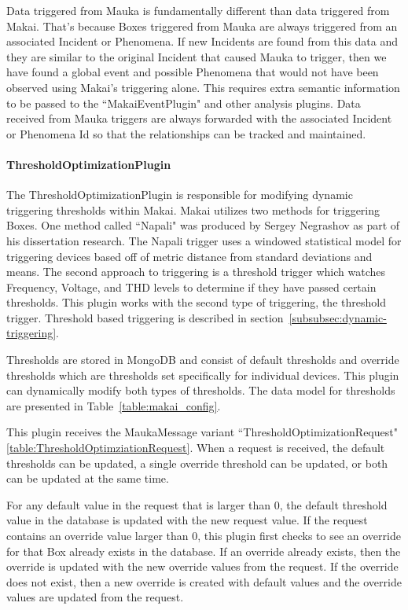 Data triggered from Mauka is fundamentally different than data triggered from Makai. That's because Boxes triggered from Mauka are always triggered from an associated Incident or Phenomena. If new Incidents are found from this data and they are similar to the original Incident that caused Mauka to trigger, then we have found a global event and possible Phenomena that would not have been observed using Makai's triggering alone. This requires extra semantic information to be passed to the ``MakaiEventPlugin" and other analysis plugins. Data received from Mauka triggers are always forwarded with the associated Incident or Phenomena Id so that the relationships can be tracked and maintained.

\paragraph{ThresholdOptimizationPlugin}\label{subsubsec:threshold-optimization-pugin}
The ThresholdOptimizationPlugin is responsible for modifying dynamic triggering thresholds within Makai. Makai utilizes two methods for triggering Boxes. One method called ``Napali" was produced by Sergey Negrashov as part of his dissertation research. The Napali trigger uses a windowed statistical model for triggering devices based off of metric distance from standard deviations and means. The second approach to triggering is a threshold trigger which watches Frequency, Voltage, and THD levels to determine if they have passed certain thresholds. This plugin works with the second type of triggering, the threshold trigger. Threshold based triggering is described in section~\ref{subsubsec:dynamic-triggering}.

Thresholds are stored in MongoDB and consist of default thresholds and override thresholds which are thresholds set specifically for individual devices. This plugin can dynamically modify both types of thresholds. The data model for thresholds are presented in Table~\ref{table:makai_config}.

This plugin receives the MaukaMessage variant ``ThresholdOptimizationRequest"\ref{table:ThresholdOptimziationRequest}. When a request is received, the default thresholds can be updated, a single override threshold can be updated, or both can be updated at the same time.

For any default value in the request that is larger than 0, the default threshold value in the database is updated with the new request value. If the request contains an override value larger than 0, this plugin first checks to see an override for that Box already exists in the database. If an override already exists, then the override is updated with the new override values from the request. If the override does not exist, then a new override is created with default values and the override values are updated from the request.


